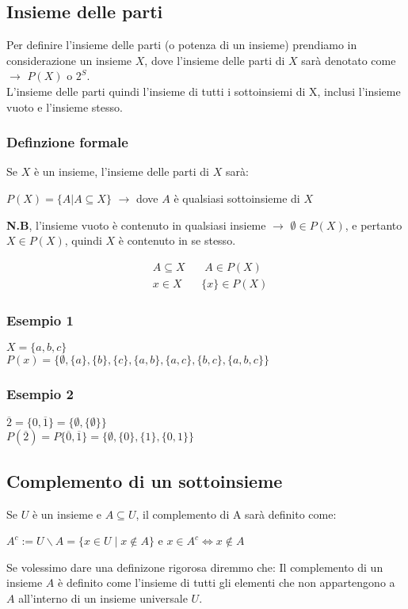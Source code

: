 \documentclass[article,12pt]{book}
\begin{document}
\begin{enumerate}
\begin{center}
        
\end{center}
\newpage

\subsection{Insieme delle parti}
Per definire l'insieme delle parti (o potenza di un insieme) prendiamo in considerazione un insieme $X$, dove l'insieme delle parti di $X$ sarà denotato come $\rightarrow$ $P(X)$ o $2^S$. \\
L'insieme delle parti quindi l'insieme di tutti i sottoinsiemi di X, inclusi l'insieme vuoto e l'insieme stesso.

\subsubsection{Definzione formale}
Se $X$ è un insieme, l'insieme delle parti di $X$ sarà:
    \begin{center}
        $P(X)=\{A|A \subseteq X\}$ $\rightarrow$ dove $A$ è qualsiasi sottoinsieme di $X$
    \end{center}
\textbf{N.B}, l'insieme vuoto è contenuto in qualsiasi insieme $\rightarrow$ $\emptyset \in P(X)$, e pertanto $X \in P(X)$, quindi $X$ è contenuto in se stesso.
    \begin{center}
        \begin{align*}
        &A \subseteq X \ \ \ \ \ \ \ \ A \in P(X) \\
        &x \in X \ \ \ \ \ \ \ \ \{x\} \in P(X)
        \end{align*}
    \end{center}
\subsubsection{Esempio 1}
$X = \{a,b,c\}$ \\
$P(x)=\{\emptyset,\{a\},\{b\},\{c\},\{a,b\},\{a,c\},\{b,c\},\{a,b,c\}\}$

\subsubsection{Esempio 2}
$\overline{2}=\{0,\overline{1}\}=\{\emptyset,\{\emptyset\}\}$ \\
$P(\overline{2})=P\{\overline{0},\overline{1}\}=\{\emptyset,\{0\},\{1\},\{0,1\}\}$

\newpage
\subsection{Complemento di un sottoinsieme}
Se $U$ è un insieme e $A \subseteq U$, il complemento di A sarà definito come: \\
    \begin{center}
        $A^{c}:=U\smallsetminus A=\{x\in U\mid x\notin A\}$ e $x \in A^c \iff x \notin A$
    \end{center}
Se volessimo dare una definizone rigorosa diremmo che: Il complemento di un insieme $A$ è definito come l'insieme di tutti gli elementi che non appartengono a $A$ all'interno di un insieme universale $U$.


\end{enumerate}
\end{document}
